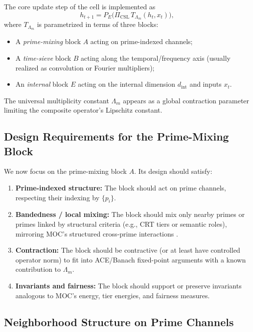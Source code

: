 \documentclass[11pt]{article}
\begin{document}
The core update step of the cell is implemented as
\[
  h_{t+1}
  =
  P_E\bigl(
    \Pi_{\text{CSL}}\, T_{\Lambda_m}(h_t, x_t)
  \bigr),
\]
where \(T_{\Lambda_m}\) is parametrized in terms of three blocks:
\begin{itemize}[leftmargin=1.5em]
  \item A \emph{prime-mixing} block \(A\) acting on prime-indexed channels;
  \item A \emph{time-sieve} block \(B\) acting along the temporal/frequency
  axis (usually realized as convolution or Fourier multipliers);
  \item An \emph{internal} block \(E\) acting on the internal dimension
  \(d_{\text{int}}\) and inputs \(x_t\).
\end{itemize}
The universal multiplicity constant \(\Lambda_m\) appears as a global
contraction parameter limiting the composite operator's Lipschitz constant.

\subsection{Design Requirements for the Prime-Mixing Block}

We now focus on the prime-mixing block \(A\). Its design should satisfy:
\begin{enumerate}[label=(\roman*), leftmargin=1.5em]
  \item \textbf{Prime-indexed structure:} The block should act on prime
  channels, respecting their indexing by \(\{p_i\}\).
  \item \textbf{Bandedness / local mixing:} The block should mix only nearby
  primes or primes linked by structural criteria (e.g., CRT tiers or semantic
  roles), mirroring MOC's structured cross-prime interactions \cite{MOC}.
  \item \textbf{Contraction:} The block should be contractive (or at least
  have controlled operator norm) to fit into ACE/Banach fixed-point arguments
  with a known contribution to \(\Lambda_m\).
  \item \textbf{Invariants and fairness:} The block should support or preserve
  invariants analogous to MOC's energy, tier energies, and fairness measures.
\end{enumerate}

\subsection{Neighborhood Structure on Prime Channels}
\end{document}
